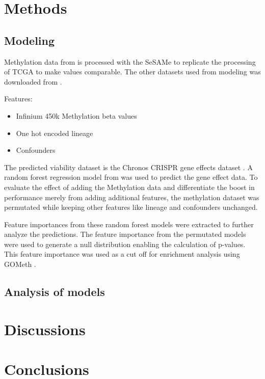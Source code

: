 \documentclass[10pt, a4paper, twocolumn]{article} %
\begin{document}
\section{Methods}

\subsection{Modeling}
Methylation data from \citep{Iorio2016-mq} is processed with the SeSAMe  \citep{10.1093/nar/gky691} to replicate the processing of TCGA to make values comparable. The other datasets used from modeling was downloaded from \citep{DepMap2022}.

Features:

\begin{itemize}
    \item Infinium 450k Methylation beta values
    \item One hot encoded lineage
    \item Confounders
\end{itemize}

The predicted viability dataset is the Chronos CRISPR gene effects dataset \citep{DepMap2022, Dempster2021}. A random forest regression model from \citep{Krill-Burger2022.03.02.482624} was used to predict the gene effect data. To evaluate the effect of adding the Methylation data and differentiate the boost in performance merely from adding additional features, the methylation dataset was permutated while keeping other features like lineage and confounders unchanged. 

Feature importances from these random forest models were extracted to further analyze the predictions. The feature importance from the permutated models were used to generate a null distribution enabling the calculation of p-values. This feature importance was used as a cut off for enrichment analysis using GOMeth \citep{Maksimovic2021}.

\subsection{Analysis of models}

\section{Discussions}


\section{Conclusions}





\clearpage
\printbibliography[title={Bibliography}] %

\end{document}
